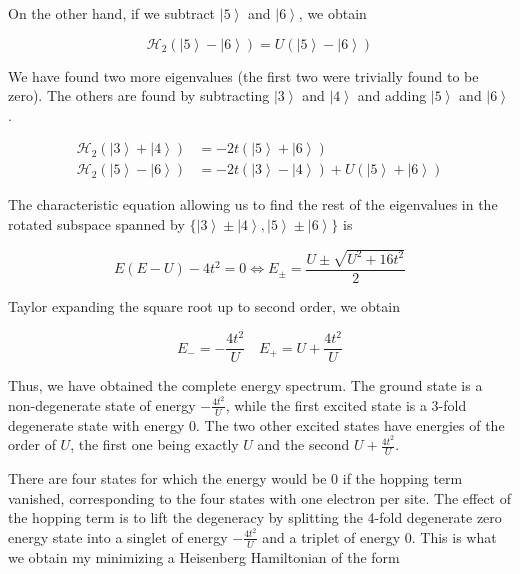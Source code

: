 On the other hand, if we subtract $\left| 5 \right\rangle$ and $\left| 6 \right\rangle$, we obtain

\begin{equation}
\mathcal{H}_{2}(\left| 5 \right\rangle -\left| 6 \right\rangle) = U( \left| 5 \right\rangle - \left| 6 \right\rangle)
\end{equation}

We have found two more eigenvalues (the first two were trivially found to be zero).
The others are found by subtracting $\left| 3 \right\rangle$ and $\left| 4 \right\rangle $ and adding $\left| 5 \right\rangle$ and $\left| 6 \right\rangle$.

\begin{equation}
\begin{split}
\mathcal{H}_{2} ( \left| 3 \right\rangle + \left| 4 \right\rangle ) &= -2 t  (\left| 5 \right\rangle + \left| 6 \right\rangle) \\
\mathcal{H}_{2}(\left| 5 \right\rangle -\left| 6 \right\rangle) &= - 2 t (\left| 3 \right\rangle - \left| 4 \right\rangle ) + U (\left| 5 \right\rangle + \left| 6 \right\rangle) 
\end{split}
\end{equation}

The characteristic equation allowing us to find the rest of the eigenvalues in the rotated subspace spanned by $\{\left| 3 \right\rangle \pm \left| 4 \right\rangle, \left| 5 \right\rangle \pm \left| 6 \right\rangle  \}$ is

\begin{equation}
E ( E - U ) - 4 t^2 = 0 \iff E_{\pm} = \frac{U \pm \sqrt{U^2 + 16 t^2}}{2}
\end{equation}

Taylor expanding the square root up to second order, we obtain

\begin{equation}
E_- = -\frac{4t^2}{U} \quad E_+ = U + \frac{4t^2}{U}
\end{equation}

Thus, we have obtained the complete energy spectrum.
The ground state is a non-degenerate state of energy $-\frac{4t^2}{U}$, while the first excited state is a 3-fold degenerate state with energy $0$.
The two other excited states have energies of the order of $U$, the first one being exactly $U$ and the second $U + \frac{4t^2}{U}$.

There are four states for which the energy would be 0 if the hopping term vanished, corresponding to the four states with one electron per site.
The effect of the hopping term is to lift the degeneracy by splitting the 4-fold degenerate zero energy state into a singlet of energy $-\frac{4t^2}{U}$ and a triplet of energy $0$.
This is what we obtain my minimizing a Heisenberg Hamiltonian of the form

